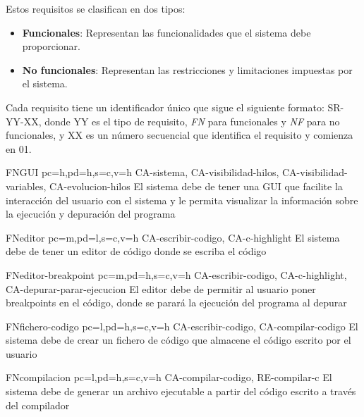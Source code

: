 Estos requisitos se clasifican en dos tipos:
\begin{itemize}
    \item \textbf{Funcionales}: Representan las funcionalidades que el sistema debe proporcionar.
    \item \textbf{No funcionales}: Representan las restricciones y limitaciones impuestas por el sistema.
\end{itemize}

Cada requisito tiene un identificador único que sigue el siguiente formato: SR-YY-XX, donde YY es el tipo de requisito, \textit{FN} para funcionales y \textit{NF} para no funcionales, y XX es un número secuencial que identifica el requisito y comienza en 01.

\printsreqtemplate

\begin{softwareReq}{FN}{GUI}
    {pc=h,pd=h,s=c,v=h}
    {CA-sistema, CA-visibilidad-hilos, CA-visibilidad-variables, CA-evolucion-hilos}
    El sistema debe de tener una \gls{GUI} que facilite la interacción del usuario con el sistema y le permita visualizar la información sobre la ejecución y depuración del programa
\end{softwareReq}

\begin{softwareReq}{FN}{editor}
    {pc=m,pd=l,s=c,v=h}
    {CA-escribir-codigo, CA-c-highlight}
    El sistema debe de tener un editor de código donde se escriba el código
\end{softwareReq}

\begin{softwareReq}{FN}{editor-breakpoint}
    {pc=m,pd=h,s=c,v=h}
    {CA-escribir-codigo, CA-c-highlight, CA-depurar-parar-ejecucion}
    El editor debe de permitir al usuario poner \glspl{breakpoint} en el código, donde se parará la ejecución del programa al depurar
\end{softwareReq}

\begin{softwareReq}{FN}{fichero-codigo}
    {pc=l,pd=h,s=c,v=h}
    {CA-escribir-codigo, CA-compilar-codigo}
    El sistema debe de crear un fichero de código que almacene el código escrito por el usuario
\end{softwareReq}

\begin{softwareReq}{FN}{compilacion}
    {pc=l,pd=h,s=c,v=h}
    {CA-compilar-codigo, RE-compilar-c}
    El sistema debe de generar un archivo ejecutable a partir del código escrito a través del compilador
\end{softwareReq}

